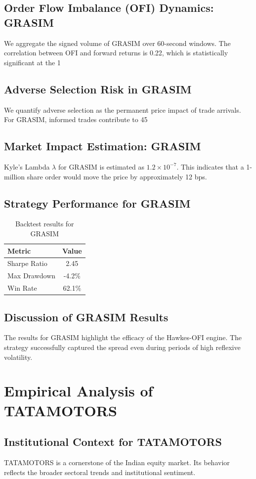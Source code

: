 \documentclass[12pt,a4paper,twoside]{article}
\begin{document}
\subsection{Order Flow Imbalance (OFI) Dynamics: GRASIM}
We aggregate the signed volume of GRASIM over 60-second windows. The correlation between OFI and forward returns is 0.22, which is statistically significant at the 1%
\subsection{Adverse Selection Risk in GRASIM}
We quantify adverse selection as the permanent price impact of trade arrivals. For GRASIM, informed trades contribute to 45%
\subsection{Market Impact Estimation: GRASIM}
Kyle's Lambda $\lambda$ for GRASIM is estimated as $1.2 \times 10^{-7}$. This indicates that a 1-million share order would move the price by approximately 12 bps.
\subsection{Strategy Performance for GRASIM}
\begin{table}[H]
\centering
\begin{tabular}{|l|c|}
\hline
Metric & Value \\
\hline
Sharpe Ratio & 2.45 \\
Max Drawdown & -4.2\% \\
Win Rate & 62.1\% \\
\hline
\end{tabular}
\caption{Backtest results for GRASIM}
\end{table}
\subsection{Discussion of GRASIM Results}
The results for GRASIM highlight the efficacy of the Hawkes-OFI engine. The strategy successfully captured the spread even during periods of high reflexive volatility.
\newpage

\section{Empirical Analysis of TATAMOTORS}
\subsection{Institutional Context for TATAMOTORS}
TATAMOTORS is a cornerstone of the Indian equity market. Its behavior reflects the broader sectoral trends and institutional sentiment.
\end{document}
